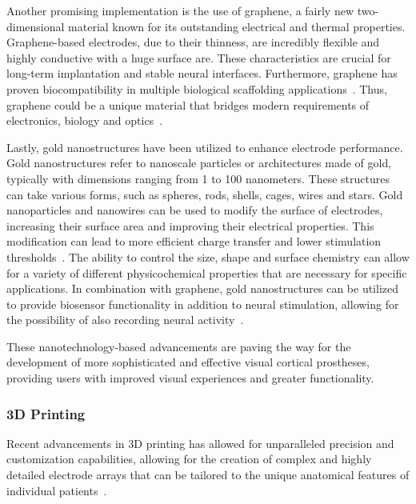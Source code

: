 \documentclass[twocolumn,10pt]{article}
\begin{document}
Another promising implementation is the use of graphene, a fairly new
two-dimensional material known for its outstanding electrical and thermal
properties. Graphene-based electrodes, due to their thinness, are incredibly
flexible and highly conductive with a huge surface are. These characteristics
are crucial for long-term implantation and stable neural interfaces.
Furthermore, graphene has proven biocompatibility in multiple biological
scaffolding
applications~\parencite{liThreedimensionalGrapheneFoam2013,sahniBiocompatibilityPristineGraphene2013}.
Thus, graphene could be a unique material that bridges modern requirements of
electronics, biology and
optics~\parencite{luGraphenebasedNeurotechnologiesAdvanced2018}.

Lastly, gold nanostructures have been utilized to enhance electrode performance.
Gold nanostructures refer to nanoscale particles or architectures made of gold,
typically with dimensions ranging from 1 to 100 nanometers. These structures can
take various forms, such as spheres, rods, shells, cages, wires and stars. Gold
nanoparticles and nanowires can be used to modify the surface of electrodes,
increasing their surface area and improving their electrical properties. This
modification can lead to more efficient charge transfer and lower stimulation
thresholds~\parencite{zareGoldNanostructuresSynthesis2022}. The ability to
control the size, shape and surface chemistry can allow for a variety of
different physicochemical properties that are necessary for specific
applications. In combination with graphene, gold nanostructures can be utilized
to provide biosensor functionality in addition to neural stimulation, allowing
for the possibility of also recording neural
activity~\parencite{raufGoldNanostructuredLaserscribed2021}.

These nanotechnology-based advancements are paving the way for the development
of more sophisticated and effective visual cortical prostheses, providing users
with improved visual experiences and greater functionality.

\subsubsection*{3D Printing}
Recent advancements in 3D printing has allowed for unparalleled precision and
customization capabilities, allowing for the creation of complex and highly
detailed electrode arrays that can be tailored to the unique anatomical features
of individual patients~\parencite{guoImplantableLiquidMetalbased2017}.
\end{document}
